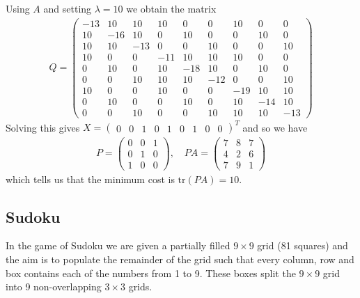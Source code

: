 \documentclass{article}
\begin{document}
\noindent Using \(A\) and setting \(\lambda = 10\) we obtain the matrix
\begin{align*}
    Q = \begin{pmatrix}
        -13 & 10 & 10 & 10 & 0 & 0 & 10 & 0 & 0 \\
        10 & -16 & 10 & 0 & 10 & 0 & 0 & 10 & 0 \\
        10 & 10 & -13 & 0 & 0 & 10 & 0 & 0 & 10 \\
        10 & 0 & 0 & -11 & 10 & 10 & 10 & 0 & 0 \\
        0 & 10 & 0 & 10 & -18 & 10 & 0 & 10 & 0 \\
        0 & 0 & 10 & 10 & 10 & -12 & 0 & 0 & 10 \\
        10 & 0 & 0 & 10 & 0 & 0 & -19 & 10 & 10 \\
        0 & 10 & 0 & 0 & 10 & 0 & 10 & -14 & 10 \\
        0 & 0 & 10 & 0 & 0 & 10 & 10 & 10 & -13
    \end{pmatrix}
\end{align*}
Solving this gives \(X = \begin{pmatrix}
    0 & 0 & 1 & 0 & 1 & 0 & 1 & 0 & 0
\end{pmatrix}^T\)
and so we have \begin{align*}
    P = \begin{pmatrix}
        0 & 0 & 1 \\
        0 & 1 & 0 \\
        1 & 0 & 0
    \end{pmatrix}, \quad PA = \begin{pmatrix}
        7 & 8 & 7 \\
        4 & 2 & 6 \\
        7 & 9 & 1
    \end{pmatrix}
\end{align*}
which tells us that the minimum cost is \(\text{tr}(PA) = 10\).
\subsection{Sudoku}

In the game of Sudoku we are given a partially filled \(9 \times 9\) grid (81 squares) and the aim is to populate the remainder of the grid such that every column, row and box contains each of the numbers from 1 to 9. These boxes split the \(9 \times 9\) grid into 9 non-overlapping \(3 \times 3\) grids.\\

\hspace{92pt}\begin{lpsudoku}[scale=0.5]
\end{lpsudoku}\\
\\
\end{document}
